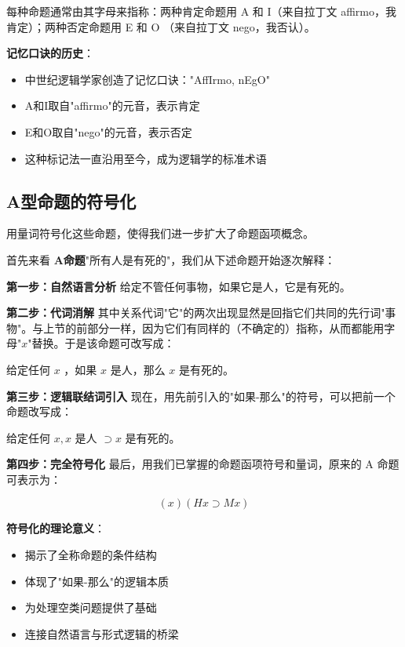 \begin{examplebox}[title=命题类型标记的词源学]
每种命题通常由其字母来指称：两种肯定命题用 A 和 I（来自拉丁文 affirmo，我肯定）；两种否定命题用 E 和 O （来自拉丁文 nego，我否认）。\cite{peirce1883}

\textbf{记忆口诀的历史}：
\begin{itemize}
\item 中世纪逻辑学家创造了记忆口诀："AffIrmo, nEgO"
\item A和I取自"affirmo"的元音，表示肯定
\item E和O取自"nego"的元音，表示否定
\item 这种标记法一直沿用至今，成为逻辑学的标准术语
\end{itemize}
\end{examplebox}

\subsection{A型命题的符号化}

用量词符号化这些命题，使得我们进一步扩大了命题函项概念。

\begin{theorembox}[title=A型命题的逐步符号化过程]
首先来看 \textbf{A命题}"所有人是有死的"，我们从下述命题开始逐次解释：

\textbf{第一步：自然语言分析}
给定不管任何事物，如果它是人，它是有死的。

\textbf{第二步：代词消解}
其中关系代词"它"的两次出现显然是回指它们共同的先行词"事物"。与上节的前部分一样，因为它们有同样的（不确定的）指称，从而都能用字母"$x$"替换。于是该命题可改写成：

给定任何 $x$ ，如果 $x$ 是人，那么 $x$ 是有死的。

\textbf{第三步：逻辑联结词引入}
现在，用先前引入的"如果-那么"的符号，可以把前一个命题改写成：

给定任何 $x, x$ 是人 $\supset x$ 是有死的。

\textbf{第四步：完全符号化}
最后，用我们已掌握的命题函项符号和量词，原来的 A 命题可表示为：

$$(x)(H x \supset M x)$$

\textbf{符号化的理论意义}：
\begin{itemize}
\item 揭示了全称命题的条件结构
\item 体现了"如果-那么"的逻辑本质
\item 为处理空类问题提供了基础
\item 连接自然语言与形式逻辑的桥梁
\end{itemize}
\end{theorembox}

